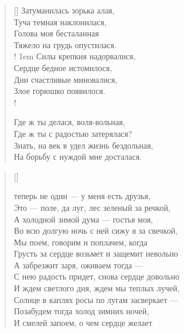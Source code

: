 \settowidth{\versewidth}{\vinДни счастливые миновалися,}
\begin{verse}[\versewidth]
Затуманилась зорька алая,\\
Туча темная наклонилася,\\
Голова моя бесталанная\\
Тяжело на грудь опустилася.\\!
\begingroup
\leftskip1em
\rightskip\leftskip
    Силы крепкия  надорвалися,\\
    Сердце бедное истомилося,\\
    Дни счастливые миновалися,\\
    Злое горюшко появилося.\\!
\endgroup

Где ж ты делася, воля-вольная,\\
Где ж ты с радостью затерялася?\\
Знать, на век в удел жизнь бездольная,\\
На борьбу с нуждой мне досталася.
\end{verse}


\newpage
\vspace*{0cm}

\settowidth{\versewidth}{Это --- поле, да луг, лес зеленый за речкой,}
\begin{verse}[\versewidth]
\begin{patverse*}
 теперь не один --- у меня есть друзья,\\
Это --- поле, да луг, лес зеленый за речкой,\\
    А холодной зимой дума --- гостья моя,\\
Во всю долгую ночь с ней сижу я за свечкой,\\
    Мы поем, говорим и поплачем, когда\\
Грусть за сердце возьмет и защемит невольно\ldotst\\
    А забрезжит заря, оживаем тогда ---\\
С нею радость придет, снова сердце довольно\ldotst\\
    И ждем светлого дня, ждем мы теплых лучей,\\
Солнце в каплях росы по лугам засверкает ---\\
    Позабудем тогда холод зимних ночей,\\
И смелей запоем, о чем сердце желает\ldotst
\end{patverse*}
\end{verse}

